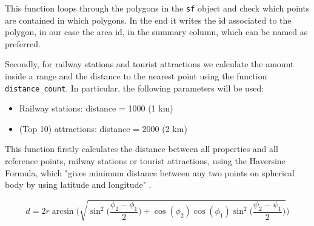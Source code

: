 

This function loops through the polygons in the \texttt{sf} object and check which points are contained in which polygons. In the end it writes the id associated to the polygon, in our case the area id, in the summary column, which can be named as preferred.

Secondly, for railway stations and tourist attractions we calculate the amount inside a range and the distance to the nearest point using the function \texttt{distance\_count}. In particular, the following parameters will be used:

\begin{itemize}

    \item Railway stations: distance = 1000 (1 km)

    \item (Top 10) attractions: distance = 2000 (2 km)
    
\end{itemize}



This function firstly calculates the distance between all properties and all reference points, railway stations or tourist attractions, using the Haversine Formula, which "gives  minimum  distance  between  any  two  points  on  spherical body by using latitude and longitude" \citep{haversine:2013}.

\begin{equation}
d = 2r \arcsin \Bigg(\sqrt{\sin^2\Big(\frac{\phi_2 - \phi_1}{2}\Big) + \cos(\phi_2)\cos(\phi_1)\sin^2\Big(\frac{\psi_2 - \psi_1}{2}\Big)}\Bigg)
\end{equation}




\iffalse

